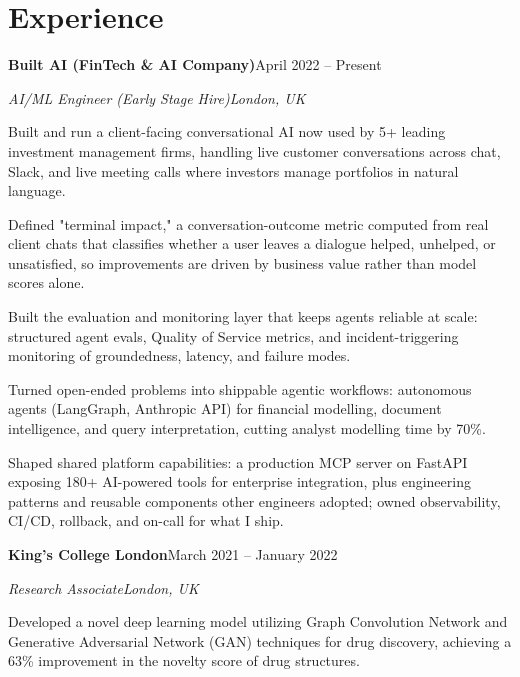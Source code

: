 \documentclass[10pt,a4paper]{article}
\newcommand{\entry}[4]{%
  {\color{company}\bfseries #1}\hfill {\color{muted}#2}\par
  \vspace{1pt}
  {\itshape #3}\hfill {\color{muted}\itshape #4}\par
  \vspace{3pt}%
}
\begin{document}
\section{Experience}
\entry{Built AI (FinTech \& AI Company)}{April 2022 -- Present}{AI/ML Engineer (Early Stage Hire)}{London, UK}
\begin{tight}
  \item Built and run a client-facing conversational AI now used by 5+ leading investment management firms, handling live customer conversations across chat, Slack, and live meeting calls where investors manage portfolios in natural language.
  \item Defined "terminal impact," a conversation-outcome metric computed from real client chats that classifies whether a user leaves a dialogue helped, unhelped, or unsatisfied, so improvements are driven by business value rather than model scores alone.
  \item Built the evaluation and monitoring layer that keeps agents reliable at scale: structured agent evals, Quality of Service metrics, and incident-triggering monitoring of groundedness, latency, and failure modes.
  \item Turned open-ended problems into shippable agentic workflows: autonomous agents (LangGraph, Anthropic API) for financial modelling, document intelligence, and query interpretation, cutting analyst modelling time by 70\%.
  \item Shaped shared platform capabilities: a production MCP server on FastAPI exposing 180+ AI-powered tools for enterprise integration, plus engineering patterns and reusable components other engineers adopted; owned observability, CI/CD, rollback, and on-call for what I ship.
\end{tight}

\entry{King's College London}{March 2021 -- January 2022}{Research Associate}{London, UK}
\begin{tight}
  \item Developed a novel deep learning model utilizing Graph Convolution Network and Generative Adversarial Network (GAN) techniques for drug discovery, achieving a 63\% improvement in the novelty score of drug structures.
\end{tight}

\end{document}
